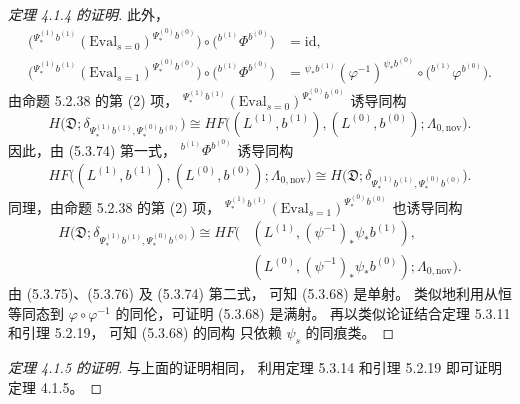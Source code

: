 \begin{proof}[定理 4.1.4 的证明]
此外，
\begin{equation}
\begin{aligned}
\bigl(
{}^{\Psi_*^{(1)}b^{(1)}}
(\mathrm{Eval}_{s=0})^{\Psi_*^{(0)}b^{(0)}}
\bigr)
\circ
\bigl({}^{b^{(1)}}\Phi^{b^{(0)}}\bigr)
&=\mathrm{id},\\
\bigl(
{}^{\Psi_*^{(1)}b^{(1)}}
(\mathrm{Eval}_{s=1})^{\Psi_*^{(0)}b^{(0)}}
\bigr)
\circ
\bigl({}^{b^{(1)}}\Phi^{b^{(0)}}\bigr)
&=
{}^{\psi_*b^{(1)}}
(\varphi^{-1})^{\psi_*b^{(0)}}
\circ
\bigl({}^{b^{(1)}}\varphi^{b^{(0)}}\bigr).
\end{aligned}
\tag{5.3.74}\label{eq:5-3-74}
\end{equation}
由命题 5.2.38 的第 \textup{(2)} 项，
\({}^{\Psi_*^{(1)}b^{(1)}}
(\mathrm{Eval}_{s=0})^{\Psi_*^{(0)}b^{(0)}}\)
诱导同构
\[
H\bigl(
\mathfrak D;
\delta_{\Psi_*^{(1)}b^{(1)},
\Psi_*^{(0)}b^{(0)}}
\bigr)
\cong
HF\bigl(
(L^{(1)},b^{(1)}),
(L^{(0)},b^{(0)});
\Lambda_{0,\mathrm{nov}}
\bigr).
\]
因此，由 (5.3.74) 第一式，
\({}^{b^{(1)}}\Phi^{b^{(0)}}\)
诱导同构
\begin{equation}
\begin{aligned}
HF\bigl(
(L^{(1)},b^{(1)}),
(L^{(0)},b^{(0)});
\Lambda_{0,\mathrm{nov}}
\bigr)
\cong
H\bigl(
\mathfrak D;
\delta_{\Psi_*^{(1)}b^{(1)},
\Psi_*^{(0)}b^{(0)}}
\bigr).
\end{aligned}
\tag{5.3.75}\label{eq:5-3-75}
\end{equation}
同理，由命题 5.2.38 的第 \textup{(2)} 项，
\({}^{\Psi_*^{(1)}b^{(1)}}
(\mathrm{Eval}_{s=1})^{\Psi_*^{(0)}b^{(0)}}\)
也诱导同构
\begin{equation}
\begin{aligned}
H\bigl(
\mathfrak D;
\delta_{\Psi_*^{(1)}b^{(1)},
\Psi_*^{(0)}b^{(0)}}
\bigr)
\cong
HF\bigl(
&(L^{(1)},
(\psi^{-1})_*\psi_*b^{(1)}),\\
&(L^{(0)},
(\psi^{-1})_*\psi_*b^{(0)});
\Lambda_{0,\mathrm{nov}}
\bigr).
\end{aligned}
\tag{5.3.76}\label{eq:5-3-76}
\end{equation}
由 (5.3.75)、(5.3.76)
及 (5.3.74) 第二式，
可知 (5.3.68) 是单射。
类似地利用从恒等同态到
$\varphi\circ\varphi^{-1}$
的同伦，可证明 (5.3.68) 是满射。
再以类似论证结合定理 5.3.11
和引理 5.2.19，
可知 (5.3.68) 的同构
只依赖 $\psi_s$ 的同痕类。
\end{proof}

\begin{proof}[定理 4.1.5 的证明]
与上面的证明相同，
利用定理 5.3.14 和引理 5.2.19
即可证明定理 4.1.5。
\end{proof}

